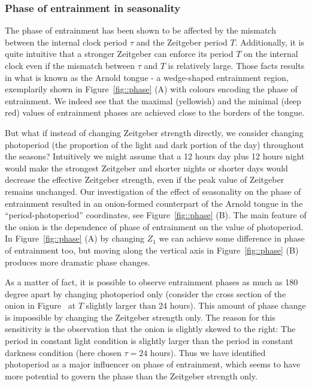 \subsubsection{Phase of entrainment in seasonality}
The phase of entrainment has been shown to be affected by the mismatch
between the internal clock period $\tau$ and the Zeitgeber period $T$.
Additionally, it is quite intuitive that a stronger Zeitgeber can
enforce its period $T$ on the internal clock even if the mismatch
between $\tau$ and $T$ is relatively large. Those facts results in
what is known as the Arnold tongue - a wedge-shaped entrainment
region, exemplarily shown in Figure~\ref{fig::phase} (A) with colours
encoding the phase of entrainment. We indeed see that the maximal
(yellowish) and the minimal (deep red) values of entrainment phases
are achieved close to the borders of the tongue.

But what if instead of changing Zeitgeber strength directly, we
consider changing photoperiod (the proportion of the light and dark
portion of the day) throughout the seasons? Intuitively we might
assume that a 12 hours day plus 12 hours night would make the
strongest Zeitgeber and shorter nights or shorter days would decrease
the effective Zeitgeber strength, even if the peak value of Zeitgeber
remains unchanged. Our investigation of the effect of seasonality on
the phase of entrainment resulted in an onion-formed counterpart of
the Arnold tongue in the ``period-photoperiod'' coordinates, see
Figure~\ref{fig::phase} (B). The main feature of the onion is the
dependence of phase of entrainment on the value of photoperiod. In
Figure~\ref{fig::phase} (A) by changing $Z_1$ we can achieve some
difference in phase of entrainment too, but moving along the vertical
axis in Figure~\ref{fig::phase} (B) produces more dramatic phase
changes.

As a matter of fact, it is possible to observe entrainment phases as
much as 180 degree apart by changing photoperiod only (consider the
cross section of the onion in Figure~\cite{fig::phase} at $T$ slightly
larger than 24 hours). This amount of phase change is impossible by
changing the Zeitgeber strength only. The reason for this sensitivity
is the observation that the onion is slightly skewed to the right: The
period in constant light condition is slightly larger than the period
in constant darkness condition (here chosen $\tau = 24$ hours). Thus
we have identified photoperiod as a major influencer on phase of
entrainment, which seems to have more potential to govern the phase
than the Zeitgeber strength only.
